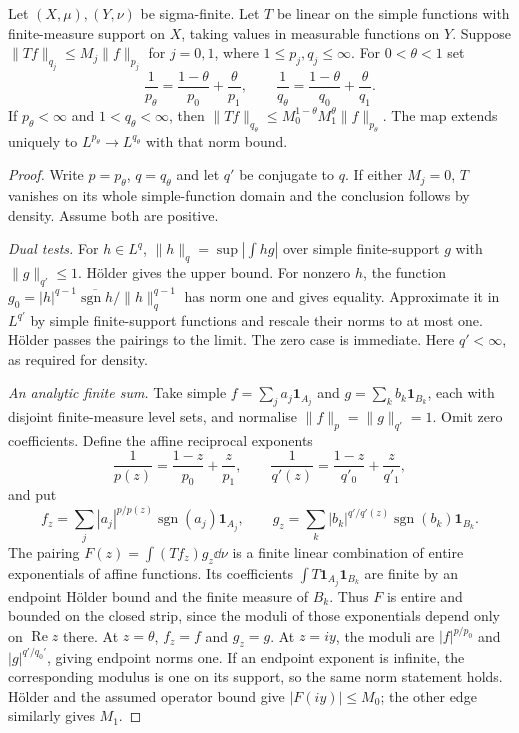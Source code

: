 \begin{theorem}\label{thm:rieszthorin}
Let $(X,\mu),(Y,\nu)$ be sigma-finite. Let $T$ be linear on the simple functions with finite-measure support on $X$, taking values in measurable functions on $Y$. Suppose
$\|Tf\|_{q_j}\le M_j\|f\|_{p_j}$ for $j=0,1$, where $1\le p_j,q_j\le\infty$.
For $0<\theta<1$ set
\[
\frac1{p_\theta}=\frac{1-\theta}{p_0}+\frac\theta{p_1},\qquad
\frac1{q_\theta}=\frac{1-\theta}{q_0}+\frac\theta{q_1}.
\]
If $p_\theta<\infty$ and $1<q_\theta<\infty$, then
$\|Tf\|_{q_\theta}\le M_0^{1-\theta}M_1^\theta\|f\|_{p_\theta}$.
The map extends uniquely to $L^{p_\theta}\to L^{q_\theta}$ with that norm bound.
\end{theorem}
\begin{proof}
Write $p=p_\theta$, $q=q_\theta$ and let $q'$ be conjugate to $q$. If either $M_j=0$, $T$ vanishes on its whole simple-function domain and the conclusion follows by density. Assume both are positive.

\emph{Dual tests.} For $h\in L^q$,
$\|h\|_q=\sup|\int hg|$ over simple finite-support $g$ with $\|g\|_{q'}\le1$. H\"older gives the upper bound. For nonzero $h$, the function $g_0=|h|^{q-1}\overline{\operatorname{sgn}h}/\|h\|_q^{q-1}$ has norm one and gives equality. Approximate it in $L^{q'}$ by simple finite-support functions and rescale their norms to at most one. H\"older passes the pairings to the limit. The zero case is immediate. Here $q'<\infty$, as required for density.

\emph{An analytic finite sum.} Take simple $f=\sum_ja_j\mathbf1_{A_j}$ and $g=\sum_kb_k\mathbf1_{B_k}$, each with disjoint finite-measure level sets, and normalise $\|f\|_p=\|g\|_{q'}=1$. Omit zero coefficients. Define the affine reciprocal exponents
\[
\frac1{p(z)}=\frac{1-z}{p_0}+\frac z{p_1},\qquad
\frac1{q'(z)}=\frac{1-z}{q'_0}+\frac z{q'_1},
\]
and put
\[
f_z=\sum_j|a_j|^{p/p(z)}\operatorname{sgn}(a_j)\mathbf1_{A_j},\qquad
g_z=\sum_k|b_k|^{q'/q'(z)}\operatorname{sgn}(b_k)\mathbf1_{B_k}.
\]
The pairing $F(z)=\int(Tf_z)g_z\dd\nu$ is a finite linear combination of entire exponentials of affine functions. Its coefficients $\int T\mathbf1_{A_j}\mathbf1_{B_k}$ are finite by an endpoint H\"older bound and the finite measure of $B_k$. Thus $F$ is entire and bounded on the closed strip, since the moduli of those exponentials depend only on $\operatorname{Re}z$ there.
At $z=\theta$, $f_z=f$ and $g_z=g$. At $z=iy$, the moduli are $|f|^{p/p_0}$ and $|g|^{q'/q_0'}$, giving endpoint norms one. If an endpoint exponent is infinite, the corresponding modulus is one on its support, so the same norm statement holds. H\"older and the assumed operator bound give $|F(iy)|\le M_0$; the other edge similarly gives $M_1$.


\end{proof}
